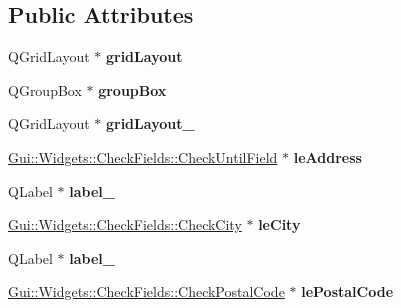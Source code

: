 \subsection*{Public Attributes}
\begin{DoxyCompactItemize}
\item 
\hypertarget{classUi__DialogAddCustomer_a11678d478f2daadf019417c6cb26440a}{Q\-Grid\-Layout $\ast$ {\bfseries grid\-Layout}}\label{classUi__DialogAddCustomer_a11678d478f2daadf019417c6cb26440a}

\item 
\hypertarget{classUi__DialogAddCustomer_a8c09f32a29913e596393af9cad6b7763}{Q\-Group\-Box $\ast$ {\bfseries group\-Box}}\label{classUi__DialogAddCustomer_a8c09f32a29913e596393af9cad6b7763}

\item 
\hypertarget{classUi__DialogAddCustomer_a7c164ffe97d8d704a3866cc1b4d2ff0e}{Q\-Grid\-Layout $\ast$ {\bfseries grid\-Layout\-\_}}\label{classUi__DialogAddCustomer_a7c164ffe97d8d704a3866cc1b4d2ff0e}

\item 
\hypertarget{classUi__DialogAddCustomer_ae770202631329ad22710d093b4ddc9c7}{\hyperlink{classGui_1_1Widgets_1_1CheckFields_1_1CheckUntilField}{Gui\-::\-Widgets\-::\-Check\-Fields\-::\-Check\-Until\-Field} $\ast$ {\bfseries le\-Address}}\label{classUi__DialogAddCustomer_ae770202631329ad22710d093b4ddc9c7}

\item 
\hypertarget{classUi__DialogAddCustomer_aa2f8adcfd01776f6a5cc3b39c1f4906d}{Q\-Label $\ast$ {\bfseries label\-\_}}\label{classUi__DialogAddCustomer_aa2f8adcfd01776f6a5cc3b39c1f4906d}

\item 
\hypertarget{classUi__DialogAddCustomer_ab22edf25515dfd70a98d96ebfb34ce53}{\hyperlink{classGui_1_1Widgets_1_1CheckFields_1_1CheckCity}{Gui\-::\-Widgets\-::\-Check\-Fields\-::\-Check\-City} $\ast$ {\bfseries le\-City}}\label{classUi__DialogAddCustomer_ab22edf25515dfd70a98d96ebfb34ce53}

\item 
\hypertarget{classUi__DialogAddCustomer_ad66f8c5da2fb56b96282f4089cc7ab2c}{Q\-Label $\ast$ {\bfseries label\-\_}}\label{classUi__DialogAddCustomer_ad66f8c5da2fb56b96282f4089cc7ab2c}

\item 
\hypertarget{classUi__DialogAddCustomer_afc686a3a984bda1bb0049dbd350089f4}{\hyperlink{classGui_1_1Widgets_1_1CheckFields_1_1CheckPostalCode}{Gui\-::\-Widgets\-::\-Check\-Fields\-::\-Check\-Postal\-Code} $\ast$ {\bfseries le\-Postal\-Code}}\label{classUi__DialogAddCustomer_afc686a3a984bda1bb0049dbd350089f4}


\end{DoxyCompactItemize}
